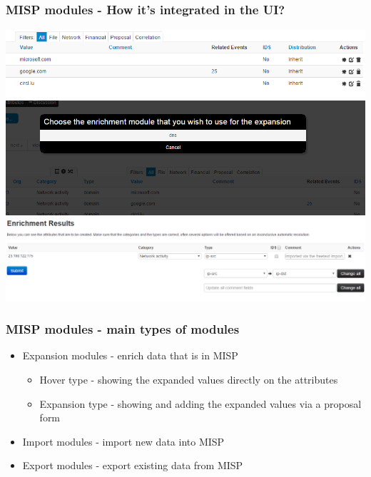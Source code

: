 \begin{frame}
        \frametitle{MISP modules - How it's integrated in the UI?}
        \includegraphics[scale=0.40]{screenshots/enrichment1.PNG}\\
        \includegraphics[scale=0.38]{screenshots/enrichment2.PNG}\\
        \includegraphics[scale=0.35]{screenshots/enrichment3.PNG}
\end{frame}

\begin{frame}
        \frametitle{MISP modules - main types of modules}
        \begin{itemize}
            \item Expansion modules - enrich data that is in MISP
                    \begin{itemize}
                        \item Hover type - showing the expanded values directly on the attributes
                        \item Expansion type - showing and adding the expanded values via a proposal form
                    \end{itemize}
            \item Import modules - import new data into MISP
            \item Export modules - export existing data from MISP
        \end{itemize}
\end{frame}

